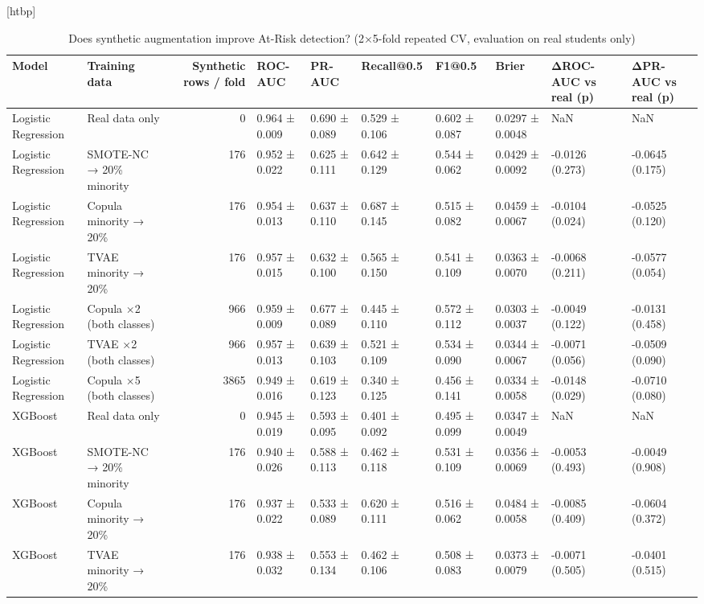 \begin{table}
\small[htbp]
\caption{Does synthetic augmentation improve At-Risk detection? (2×5-fold repeated CV, evaluation on real students only)}
\label{tab:S19_augmentation_utility}
\begin{tabular}{llrlllllll}
\toprule
Model & Training data & Synthetic rows / fold & ROC-AUC & PR-AUC & Recall@0.5 & F1@0.5 & Brier & ΔROC-AUC vs real (p) & ΔPR-AUC vs real (p) \\
\midrule
Logistic Regression & Real data only & 0 & 0.964 ± 0.009 & 0.690 ± 0.089 & 0.529 ± 0.106 & 0.602 ± 0.087 & 0.0297 ± 0.0048 & NaN & NaN \\
Logistic Regression & SMOTE-NC → 20\% minority & 176 & 0.952 ± 0.022 & 0.625 ± 0.111 & 0.642 ± 0.129 & 0.544 ± 0.062 & 0.0429 ± 0.0092 & -0.0126 (0.273) & -0.0645 (0.175) \\
Logistic Regression & Copula minority → 20\% & 176 & 0.954 ± 0.013 & 0.637 ± 0.110 & 0.687 ± 0.145 & 0.515 ± 0.082 & 0.0459 ± 0.0067 & -0.0104 (0.024) & -0.0525 (0.120) \\
Logistic Regression & TVAE minority → 20\% & 176 & 0.957 ± 0.015 & 0.632 ± 0.100 & 0.565 ± 0.150 & 0.541 ± 0.109 & 0.0363 ± 0.0070 & -0.0068 (0.211) & -0.0577 (0.054) \\
Logistic Regression & Copula ×2 (both classes) & 966 & 0.959 ± 0.009 & 0.677 ± 0.089 & 0.445 ± 0.110 & 0.572 ± 0.112 & 0.0303 ± 0.0037 & -0.0049 (0.122) & -0.0131 (0.458) \\
Logistic Regression & TVAE ×2 (both classes) & 966 & 0.957 ± 0.013 & 0.639 ± 0.103 & 0.521 ± 0.109 & 0.534 ± 0.090 & 0.0344 ± 0.0067 & -0.0071 (0.056) & -0.0509 (0.090) \\
Logistic Regression & Copula ×5 (both classes) & 3865 & 0.949 ± 0.016 & 0.619 ± 0.123 & 0.340 ± 0.125 & 0.456 ± 0.141 & 0.0334 ± 0.0058 & -0.0148 (0.029) & -0.0710 (0.080) \\
XGBoost & Real data only & 0 & 0.945 ± 0.019 & 0.593 ± 0.095 & 0.401 ± 0.092 & 0.495 ± 0.099 & 0.0347 ± 0.0049 & NaN & NaN \\
XGBoost & SMOTE-NC → 20\% minority & 176 & 0.940 ± 0.026 & 0.588 ± 0.113 & 0.462 ± 0.118 & 0.531 ± 0.109 & 0.0356 ± 0.0069 & -0.0053 (0.493) & -0.0049 (0.908) \\
XGBoost & Copula minority → 20\% & 176 & 0.937 ± 0.022 & 0.533 ± 0.089 & 0.620 ± 0.111 & 0.516 ± 0.062 & 0.0484 ± 0.0058 & -0.0085 (0.409) & -0.0604 (0.372) \\
XGBoost & TVAE minority → 20\% & 176 & 0.938 ± 0.032 & 0.553 ± 0.134 & 0.462 ± 0.106 & 0.508 ± 0.083 & 0.0373 ± 0.0079 & -0.0071 (0.505) & -0.0401 (0.515) \\

\end{tabular}
\end{table}
